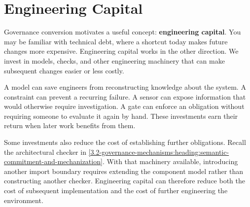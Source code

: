 \section{Engineering Capital}\label{heading:engineering-capital}




Governance conversion motivates a useful concept: \textbf{engineering capital}. You may be familiar with technical debt, where a shortcut today makes future changes more expensive. Engineering capital works in the other direction. We invest in models, checks, and other engineering machinery that can make subsequent changes easier or less costly.



A model can save engineers from reconstructing knowledge about the system. A constraint can prevent a recurring failure. A sensor can expose information that would otherwise require investigation. A gate can enforce an obligation without requiring someone to evaluate it again by hand. These investments earn their return when later work benefits from them.

Some investments also reduce the cost of establishing further obligations. Recall the architectural checker in \autoref{3.2-governance-mechanisms:heading:semantic-commitment-and-mechanization}. With that machinery available, introducing another import boundary requires extending the component model rather than constructing another checker. Engineering capital can therefore reduce both the cost of subsequent implementation and the cost of further engineering the environment.

